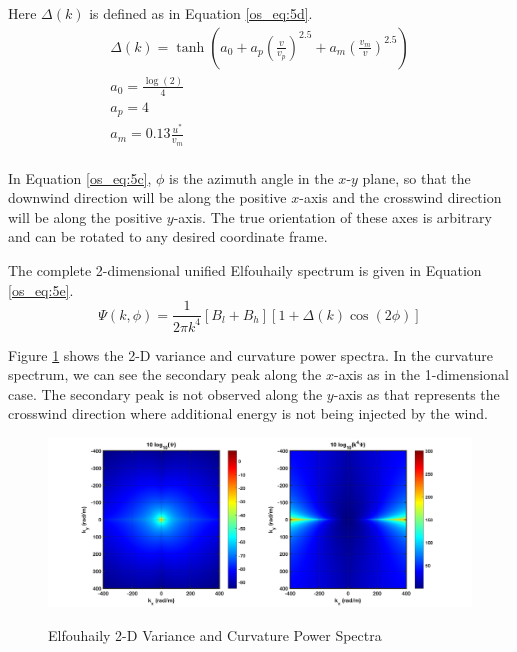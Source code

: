Here $\Delta(k)$ is defined as in Equation \ref{os_eq:5d}.
\begin{equation}
\label{os_eq:5d}
\begin{gathered}
\Delta(k) = \tanh\left( a_0 + a_p\left(\frac{v}{v_p}\right)^{2.5}  + a_m\left(\frac{v_m}{v} \right)^{2.5}\right)\\
a_0 = \frac{\log(2)}{4} \\
a_p = 4\\
a_m = 0.13\frac{u^*}{v_m} \\
\end{gathered}
\end{equation}
\renewcommand{\baselinestretch}{2} \small\normalsize

In Equation \ref{os_eq:5c}, $\phi$ is the azimuth angle in the $x$-$y$ plane, so that the downwind direction will be along the positive $x$-axis and the crosswind direction will be along the positive $y$-axis. The true orientation of these axes is arbitrary and can be rotated to any desired coordinate frame.

The complete 2-dimensional unified Elfouhaily spectrum is given in Equation \ref{os_eq:5e}.
\begin{equation}
\label{os_eq:5e}
\boxed{\Psi(k,\phi) = \frac{1}{2\pi k^4}\left[B_l + B_h \right] \left[1 + \Delta(k)\cos(2\phi) \right]}
\end{equation}

Figure \ref{os_fig:7bb} shows the 2-D variance and curvature power spectra. In the curvature spectrum, we can see the secondary peak along the $x$-axis as in the 1-dimensional case. The secondary peak is not observed along the $y$-axis as that represents the crosswind direction where additional energy is not being injected by the wind.
\begin{figure}[H]
  \begin{center}
\includegraphics[width=6in]{../media/Ocean_Surface/elf_variance_curvature_spectrum_2D.png}
  \end{center}
  \renewcommand{\baselinestretch}{1} \small\normalsize
  \begin{quote}
    \caption[Elfouhaily 2-D Variance and Curvature Power Spectra]{Elfouhaily 2-D Variance and Curvature Power Spectra\label{os_fig:7bb}}
  \end{quote}
\end{figure}
\renewcommand{\baselinestretch}{2} \small\normalsize

